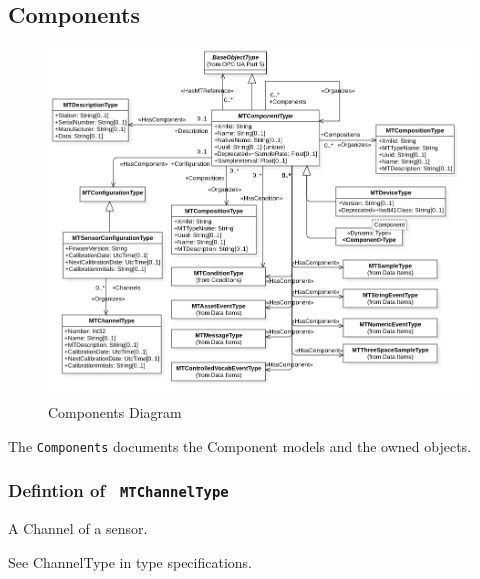 \subsection{Components} \label{model:Components}

\begin{figure}[ht]
  \centering
    \includegraphics[width=1.0\textwidth]{./diagrams/types/Components.png}
  \caption{Components Diagram}
  \label{fig:Components}
\end{figure}

\FloatBarrier


The \texttt{Components} documents the Component models and the owned objects.

\subsubsection{Defintion of \texttt{ MTChannelType}}
  \label{type:MTChannelType}

\FloatBarrier

A Channel of a sensor.

See ChannelType in type specifications.



